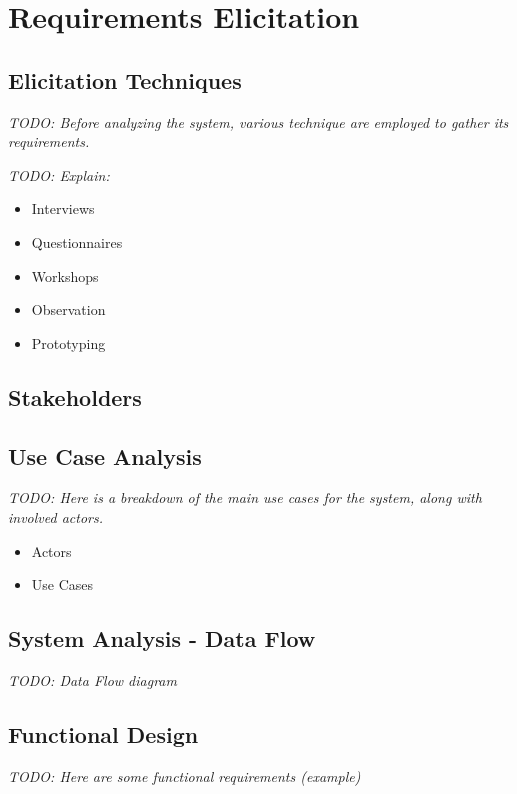 %
%
\chapter{Requirements Elicitation}

\section{Elicitation Techniques}

\textit{TODO: Before analyzing the system, various technique are employed to gather its requirements.}

\textit{TODO: Explain:}

\begin{itemize}
	\item Interviews
	\item Questionnaires
	\item Workshops
	\item Observation
	\item Prototyping
\end{itemize}

\section{Stakeholders}

\section{Use Case Analysis}

\textit{TODO: Here is a breakdown of the main use cases for the system, along with involved actors.}

\begin{itemize}
	\item Actors
	\item Use Cases
\end{itemize}

\section{System Analysis - Data Flow}

\textit{TODO: Data Flow diagram}

\section{Functional Design}

\textit{TODO: Here are some functional requirements (example)}

